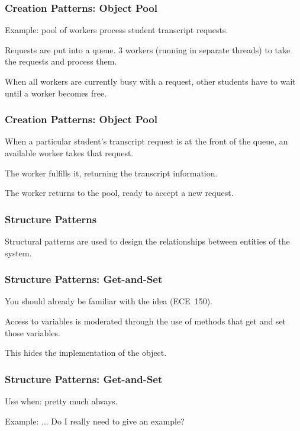 \begin{frame}
\frametitle{Creation Patterns: Object Pool}
\begin{changemargin}{1cm}

Example: pool of workers process student transcript requests. 

Requests are put into a queue. 3 workers (running in separate threads) to take the requests and process them. 

When all workers are currently busy with a request, other students have to wait until a worker becomes free. 
\end{changemargin}
\end{frame}

\begin{frame}
\frametitle{Creation Patterns: Object Pool}
\begin{changemargin}{1cm}


When a particular student's transcript request is at the front of the queue, an available worker takes that request.

The worker fulfills it, returning the transcript information.

The worker returns to the pool, ready to accept a new request.

\end{changemargin}
\end{frame}

\begin{frame}
\frametitle{Structure Patterns}
\begin{changemargin}{1cm}
Structural patterns are used to design the relationships between entities of the system.

\end{changemargin}
\end{frame}


\begin{frame}
\frametitle{Structure Patterns: Get-and-Set}
\begin{changemargin}{1cm}
You should already be familiar with the idea (ECE~150).

Access to variables is moderated through the use of methods that get and set those variables. 

This hides the implementation of the object.

\end{changemargin}
\end{frame}

\begin{frame}
\frametitle{Structure Patterns: Get-and-Set}
\begin{changemargin}{1cm}
Use when: pretty much always.

Example: ... Do I really need to give an example?
\end{changemargin}
\end{frame}


